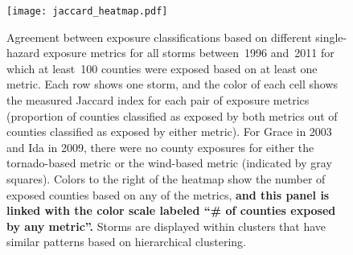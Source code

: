 \clearpage

\begin{figure}%
	\centering 
	\texttt{[image: jaccard\_heatmap.pdf]}
	\caption{Agreement between exposure classifications based on different
	single-hazard exposure metrics for all storms between~1996 and~2011 for
	which at least~100 counties were exposed based on at least one metric.
	Each row shows one storm, and the color of each cell shows the measured
	Jaccard index for each pair of exposure metrics (proportion of counties
	classified as exposed by both metrics out of counties classified as
	exposed by either metric). For Grace in 2003 and Ida in 2009, there
	were no county exposures for either the tornado-based metric or the
	wind-based metric (indicated by gray squares). Colors to the right of
	the heatmap show the number of exposed counties based on any of the
	metrics, \textbf{and this panel is linked with the color scale labeled ``\# of
	counties exposed by any metric''.} Storms are displayed within clusters
	that have similar patterns based on hierarchical clustering.}
\label{fig:jaccard} 
\end{figure}


\begin{comment}
\clearpage

\begin{figure*}%
\centering
\texttt{[image: topelecdependexposure]}
\caption{Study counties with the highest expected rate of physical exposure per year among
	 electricity-dependent Medicare beneficiaries based on each exposure metric. 
	 The color of each bar indicates the number of Medicare beneficiaries in the 
	 county reliant on electricity-dependent medical and assistive equipment as 
	 of July~2017. The length of each bar shows the average expected rate of physical exposure
	 to tropical cyclones among this population based on a given exposure metric, i.e., 
	 the expected number of these electricity-dependent Medicare beneficiaries exposed 
	 to tropical storms per year based on that metric (Table 1).}
\label{fig:topelecdependexposure}
\end{figure*}

\end{comment}
